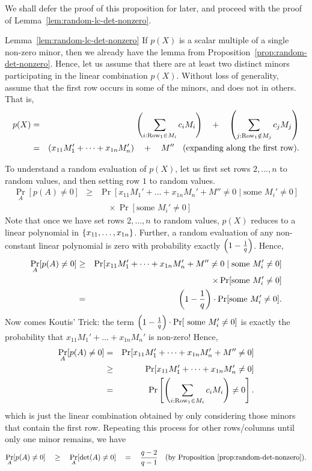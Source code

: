 We shall defer the proof of this proposition for later, and proceed with the proof of Lemma~\ref{lem:random-lc-det-nonzero}. 

\begin{proofof}{Lemma~\ref{lem:random-lc-det-nonzero}}
  If $p(X)$ is a scalar multiple of a single non-zero minor, then we
  already have the lemma from
  Proposition~\ref{prop:random-det-nonzero}. Hence, let us assume that
  there are at least two distinct minors participating in the linear
  combination $p(X)$. Without loss of generality, assume that the
  first row occurs in some of the minors, and does not in others. That is, 
  \begin{eqnarray*}
    p(X) &=& \left(\sum_{i:\text{Row}_1\in M_i} c_i M_i\right) \quad+ \quad \left(\sum_{j:\text{Row}_1\notin M_j} c_j M_j\right)\\
     & = & \left(x_{11} M_1' + \dots + x_{1n} M_{n}'\right) \quad+\quad M'' \quad\text{(expanding along the first row)}.
  \end{eqnarray*}
  
  To understand a random evaluation of $p(X)$, let us first set rows $2, \dots, n$ to random values, and
  then setting row $1$ to random values. 
  \begin{eqnarray*}
    \Pr_{A}[p(A)\neq 0] & \geq & \Pr[x_{11} M_1' + \dots + x_{1n} M_n' + M'' \neq 0 \;|\; \text{some }M_{i}'\neq 0]\\
    & & \quad \times \Pr[\text{some }M_i' \neq 0]
  \end{eqnarray*}
  Note that once we have set rows $2,\dots, n$ to random values, $p(X)$ reduces to a linear polynomial in $\left\{x_{11},\dots, x_{1n}\right\}$. Further, a random evaluation of any non-constant linear polynomial is zero with probability exactly $\left(1 -\frac{1}{q}\right)$. Hence, 
  \begin{eqnarray*}
\Pr_{A}[p(A)\neq 0] & \geq & \Pr[x_{11} M_1' + \dots + x_{1n} M_n' + M'' \neq 0 \;|\; \text{some }M_{i}'\neq 0]\\
 & & \quad \times \Pr[\text{some }M_i' \neq 0]\\
    & = & \left(1 - \frac{1}{q}\right)\cdot \Pr[\text{some }M_i' \neq 0].
  \end{eqnarray*}
  Now comes  Koutis' Trick: the term $\left(1 -
    \frac{1}{q}\right) \cdot \Pr[\text{ some }M_i' \neq 0]$ is exactly the
  probability that $x_{11}M_1' + \dots + x_{1n}M_n'$ is non-zero! Hence,
\begin{eqnarray*}
\Pr_{A}[p(A) \neq 0] & = & \Pr[ x_{11}M_1' + \dots + x_{1n} M_n' + M''\neq 0]\\
 & \geq & \Pr[ x_{11}M_1' + \dots + x_{1n} M_n'\neq 0]\\
 & = & \Pr\left[\left(\sum_{i:\text{Row}_1\in M_i} c_i M_i\right) \neq 0\right].
\end{eqnarray*}
which is just the linear combination obtained by only considering
those minors that contain the first row. Repeating this process for other
rows/columns until only  one minor remains, we have
$$
\Pr_{A}[p(A) \neq 0] \quad \geq \quad \Pr_{A}[\det(A) \neq 0] \quad = \quad
\frac{q-2}{q-1}\quad(\text{by Proposition~\ref{prop:random-det-nonzero}}).
$$
\end{proofof}


